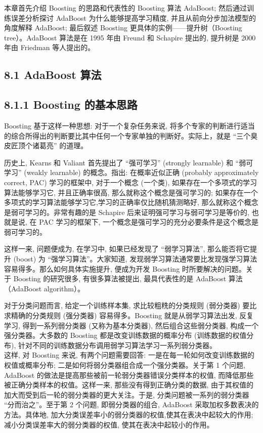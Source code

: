 \documentclass[10pt]{article}
\begin{document}
本章首先介绍 Boosting 的思路和代表性的 Boosting 算法 AdaBoost; 然后通过训练误差分析探讨 AdaBoost 为什么能够提高学习精度, 并且从前向分步加法模型的角度解释 AdaBoost; 最后叙述 Boosting 更具体的实例——提升树（Boosting tree）。AdaBoost 算法是在 1995 年由 Freund 和 Schapire 提出的, 提升树是 2000 年由 Friedman 等人提出的。

\subsection*{8.1 AdaBoost 算法}
\subsection*{8.1.1 Boosting 的基本思路}
Boosting 基于这样一种思想: 对于一个复杂任务来说, 将多个专家的判断进行适当的综合所得出的判断要比其中任何一个专家单独的判断好。实际上，就是 “三个臭皮匠顶个诸葛亮” 的道理。

历史上, Kearns 和 Valiant 首先提出了 “强可学习” (strongly learnable) 和 “弱可学习” (weakly learnable) 的概念。指出: 在概率近似正确 (probably approximately correct, PAC) 学习的框架中, 对于一个概念 (一个类), 如果存在一个多项式的学习算法能够学习它, 并且正确率很高, 那么就称这个概念是强可学习的; 如果存在一个多项式的学习算法能够学习它,学习的正确率仅比随机猜测略好, 那么就称这个概念是弱可学习的。非常有趣的是 Schapire 后来证明强可学习与弱可学习是等价的, 也就是说, 在 PAC 学习的框架下, 一个概念是强可学习的充分必要条件是这个概念是弱可学习的。

这样一来, 问题便成为, 在学习中, 如果已经发现了 “弱学习算法”, 那么能否将它提升 (boost) 为 “强学习算法”。大家知道, 发现弱学习算法通常要比发现强学习算法容易得多。那么如何具体实施提升, 便成为开发 Boosting 时所要解决的问题。关于 Boosting 的研究很多, 有很多算法被提出, 最具代表性的是 AdaBoost 算法（AdaBoost algorithm）。

对于分类问题而言, 给定一个训练样本集, 求比较粗䊁的分类规则 (弱分类器) 要比求精确的分类规则 (强分类器) 容易得多。Boosting 就是从弱学习算法出发, 反复学习, 得到一系列弱分类器 (又称为基本分类器), 然后组合这些弱分类器, 构成一个强分类器。大多数的 Boosting 都是改变训练数据的概率分布 (训练数据的权值分布), 针对不同的训练数据分布调用弱学习算法学习一系列弱分类器。\\
这样, 对 Boosting 来说, 有两个问题需要回答: 一是在每一轮如何改变训练数据的权值或概率分布; 二是如何将弱分类器组合成一个强分类器。关于第 1 个问题, AdaBoost 的做法是提高那些被前一轮弱分类器错误分类样本的权值, 而降低那些被正确分类样本的权值。这样一来, 那些没有得到正确分类的数据, 由于其权值的加大而受到后一轮的弱分类器的更大关注。于是, 分类问题被一系列的弱分类器 “分而治之”。至于第 2 个问题, 即弱分类器的组合, AdaBoost 采取加权多数表决的方法。具体地, 加大分类误差率小的弱分类器的权值,使其在表决中起较大的作用; 减小分类误差率大的弱分类器的权值, 使其在表决中起较小的作用。
\end{document}
